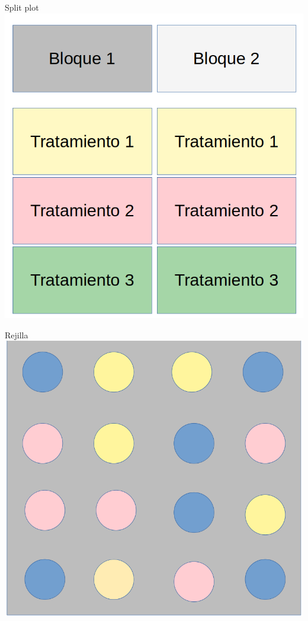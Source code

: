 \documentclass[
  11pt,
  ignorenonframetext,
]{beamer}
\begin{document}
\begin{frame}{Split plot}
\protect\hypertarget{split-plot}{}
\includegraphics{Figuras-disenos/Split-plot.png}
\end{frame}

\begin{frame}{Rejilla}
\protect\hypertarget{rejilla}{}
\includegraphics{Figuras-disenos/Rejilla.png}
\end{frame}
\end{document}
